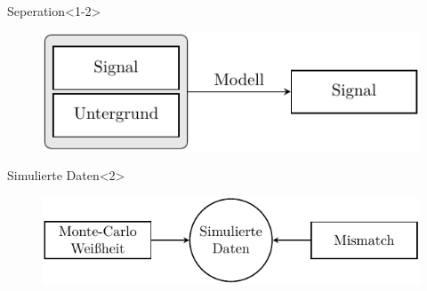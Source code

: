 \documentclass[aspectratio=1610, professionalfonts, 9pt]{beamer}
\begin{document}
\begin{frame}
  \begin{block}{Seperation}<1-2>
	\begin{figure}
	  \centering
	  \includegraphics[scale=1]{./tikz/Target/Target.pdf}
	\end{figure}
  \end{block}
  \begin{block}{Simulierte Daten}<2>
	\begin{figure}
	  \centering
	  \includegraphics[scale=1]{./tikz/Mismatch/Mismatch.pdf}
	\end{figure}
  \end{block}
\end{frame}
\end{document}
